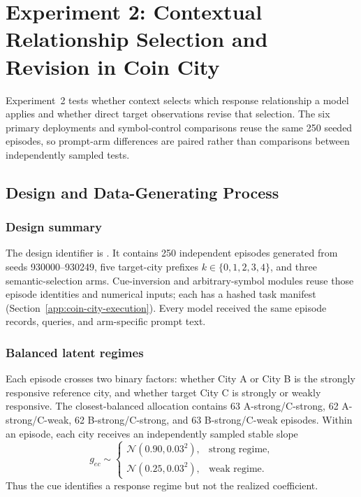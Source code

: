 
\section{Experiment 2: Contextual Relationship Selection and Revision in Coin City}
\label{app:coin-city}

Experiment~2 tests whether context
selects which response relationship a model applies and whether direct target
observations revise that selection. The six primary deployments and symbol-control
comparisons reuse the same 250 seeded episodes, so prompt-arm differences are
paired rather than comparisons between independently sampled tests.

\subsection{Design and Data-Generating Process}
\label{app:coin-city-design}

\subsubsection{Design summary}
The design identifier is
. It contains 250 independent
episodes generated from seeds 930000--930249, five target-city prefixes
\(k\in\{0,1,2,3,4\}\), and three semantic-selection arms. Cue-inversion and
arbitrary-symbol modules reuse those episode identities and numerical inputs; each
has a hashed task manifest (Section~\ref{app:coin-city-execution}). Every model received the same
episode records, queries, and arm-specific prompt text.

\subsubsection{Balanced latent regimes}
Each episode crosses two binary factors: whether City A or City B is the strongly
responsive reference city, and whether target City C is strongly or weakly
responsive. The closest-balanced allocation contains 63 A-strong/C-strong,
62 A-strong/C-weak, 62 B-strong/C-strong, and 63 B-strong/C-weak episodes.
Within an episode, each city receives an independently sampled stable slope
\[
  g_{ec}\sim
  \begin{cases}
    \mathcal N(0.90,0.03^2), & \text{strong regime},\\
    \mathcal N(0.25,0.03^2), & \text{weak regime}.
  \end{cases}
\]
Thus the cue identifies a response regime but not the realized coefficient.

